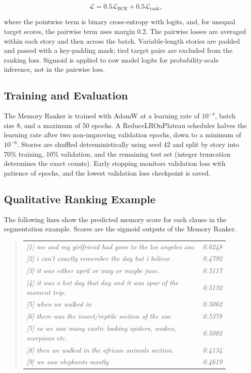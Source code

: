 \documentclass[conference]{IEEEtran}
\begin{document}
\begin{equation}
\mathcal{L}=0.5\mathcal{L}_{\mathrm{BCE}}+0.5\mathcal{L}_{\mathrm{rank}},
\end{equation}

where the pointwise term is binary cross-entropy with logits, and, for unequal target scores, the pairwise term uses margin 0.2. The pairwise losses are averaged within each story and then across the batch. Variable-length stories are padded and passed with a key-padding mask; tied target pairs are excluded from the ranking loss. Sigmoid is applied to raw model logits for probability-scale inference, not in the pairwise loss.

\subsection{Training and Evaluation}

The Memory Ranker is trained with AdamW at a learning rate of $10^{-4}$, batch size 8, and a maximum of 50 epochs. A ReduceLROnPlateau scheduler halves the learning rate after two non-improving validation epochs, down to a minimum of $10^{-6}$. Stories are shuffled deterministically using seed 42 and split by story into 70\% training, 10\% validation, and the remaining test set (integer truncation determines the exact counts). Early stopping monitors validation loss with patience of epochs, and the lowest validation loss checkpoint is saved.

\subsection{Qualitative Ranking Example}

The following lines show the predicted memory score for each clause in the segmentation example. Scores are the sigmoid outputs of the Memory Ranker.

\begin{quote}
\footnotesize
\begin{tabular}{@{}p{0.9\linewidth}@{\quad}r@{}}
\textit{[1] me and my girlfriend had gone to the los angeles zoo.} & \textit{0.6248}\\
\textit{[2] i can't exactly remember the day but i believe} & \textit{0.4792}\\
\textit{[3] it was either april or may or maybe june.} & \textit{0.5117}\\
\textit{[4] it was a hot day that day and it was spur of the moment trip.} & \textit{0.5132}\\
\textit{[5] when we walked in} & \textit{0.5062}\\
\textit{[6] there was the insect/reptile section of the zoo} & \textit{0.5378}\\
\textit{[7] so we saw many exotic looking spiders, snakes, scorpions etc.} & \textit{0.5002}\\
\textit{[8] then we walked in the african animals section.} & \textit{0.4134}\\
\textit{[9] we saw elephants mostly} & \textit{0.4619}
\end{tabular}
\end{quote}
\end{document}
